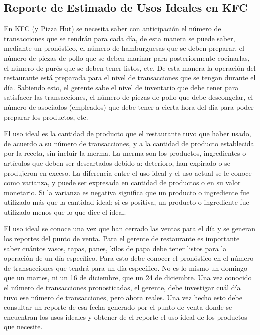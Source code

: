\subsection{Reporte de Estimado de Usos Ideales en KFC}
\label{sec:usos_ideales_kfc}

En KFC (y Pizza Hut) se necesita saber con anticipación el número de transacciones que se tendrán para cada día, de esta manera se puede saber, mediante un pronóstico, el número de hamburguesas que se deben preparar, el número de piezas de pollo que se deben marinar para posteriormente cocinarlas, el número de purés que se deben tener listos, etc. De esta manera la operación del restaurante está preparada para el nivel de transacciones que se tengan durante el día. Sabiendo esto, el gerente sabe el nivel de inventario que debe tener para satisfacer las transacciones, el número de piezas de pollo que debe descongelar, el número de asociados (empleados) que debe tener a cierta hora del día para poder preparar los productos, etc. 

El uso ideal es la cantidad de producto que el restaurante tuvo que haber usado, de acuerdo a su número de transacciones, y a la cantidad de producto establecida por la receta, sin incluir la merma. La merma son los productos, ingredientes o artículos que deben ser descartados debido a: deterioro, han expirado o se produjeron en exceso. La diferencia entre el uso ideal y el uso actual se le conoce como varianza, y puede ser expresada en cantidad de productos o en su valor monetario. Si la varianza es negativa significa que un producto o ingrediente fue utilizado más que la cantidad ideal; si es positiva, un producto o ingrediente fue utilizado menos que lo que dice el ideal.

El uso ideal se conoce una vez que han cerrado las ventas para el día y se generan los reportes del punto de venta. Para el gerente de restaurante es importante saber cuántos vasos, tapas, panes, kilos de papa debe tener listos para la operación de un día específico. Para esto debe conocer el pronóstico en el número de transacciones que tendrá para un día específico. No es lo mismo un domingo que un martes, ni un 16 de diciembre, que un 24 de diciembre. Una vez conocido el número de transacciones pronosticadas, el gerente, debe investigar cuál día tuvo ese número de transacciones, pero ahora reales. Una vez hecho esto debe consultar un reporte de esa fecha generado por el punto de venta donde se encuentran los usos ideales y obtener de el reporte el uso ideal de los productos que necesite.

